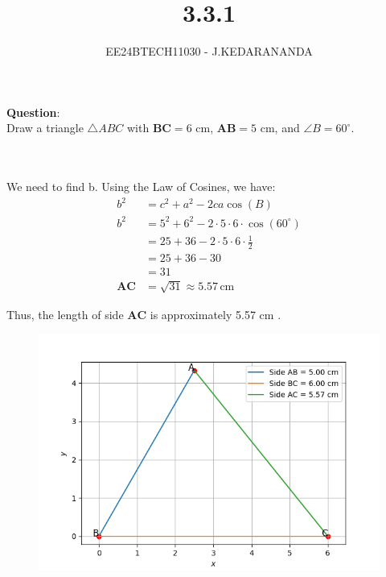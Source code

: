 \documentclass[journal]{IEEEtran}
\begin{document}

\vspace{3cm}

\title{3.3.1}
\author{EE24BTECH11030 - J.KEDARANANDA}
{\let\newpage\relax\maketitle}

\renewcommand{\thefigure}{\theenumi}
\renewcommand{\thetable}{\theenumi}
\setlength{\intextsep}{10pt} %


\renewcommand{\thetable}{\theenumi}


\textbf{Question}:\\
Draw a triangle $\triangle ABC$ with $\boldsymbol{BC} = 6 \text{ cm}$, $\boldsymbol{AB} = 5 \text{ cm}$, and $\angle B = 60^\circ$.
\\ \solution \\
    \begin{table}[h!]    
      \centering
      
      \caption{}
    \end{table}\\
We need to find b. Using the Law of Cosines, we have:
\begin{align}
    b^2 &= c^2 + a^2 - 2ca \cos(B) \\
    b^2 &= 5^2 + 6^2 - 2 \cdot 5 \cdot 6 \cdot \cos(60^\circ) \\
    &= 25 + 36 - 2 \cdot 5 \cdot 6 \cdot \frac{1}{2} \\
    &= 25 + 36 - 30 \\
    &= 31 \\
    \boldsymbol{AC} &= \sqrt{31} \approx 5.57 \, \text{cm}
\end{align}

Thus, the length of side  $\boldsymbol{AC}$  is approximately 5.57  $\text{cm}$ .

    \begin{figure}[h]
       \centering
       \includegraphics[width=\linewidth]{figs/fig1.png}
       \caption{}
       \label{graph}
    \end{figure}
\end{document}
